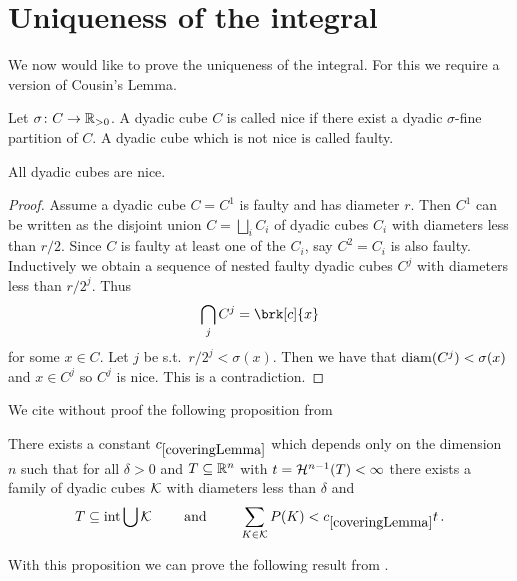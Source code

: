 \section*{Uniqueness of the integral}

We now would like to prove the uniqueness of the integral. For this we require a version of Cousin's Lemma.

\begin{definition}
Let $\sigma\colon C\to\mathbb{R}_{>0}$. A dyadic cube $C$ is called nice if there exist a dyadic $\sigma$-fine partition of $C$.
A dyadic cube which is not nice is called faulty.
\end{definition}

\begin{lemma}[Cousin]\label{le:Cousin}
All dyadic cubes are nice.
\end{lemma}
\begin{proof}
Assume a dyadic cube $C=C^1$ is faulty and has diameter $r$. Then $C^1$ can be written as the disjoint union $C=\bigsqcup_iC_i$ of dyadic cubes $C_i$ with diameters less than $r/2$. Since $C$ is faulty at least one of the $C_i$, say $C^2=C_i$ is also faulty. Inductively we obtain a sequence of nested faulty dyadic cubes $C^j$ with diameters less than $r/2^j$. Thus
\begin{align*}
	\bigcap_jC^j=\brk[c]{x}
\end{align*}
for some $x\in C$. Let $j$ be s.t.\ $r/2^j<\sigma(x)$. Then we have that $\operatorname{diam}(C^j)<\sigma(x)$ and $x\in C^j$ so $C^j$ is nice. This is a contradiction.
\end{proof}

We cite without proof the following proposition from \cite[Lemma 1.3.2]{Pfe2001}
\begin{proposition}\label{pr:coveringLemma}
There exists a constant $\useconstant{coveringLemma}$ which depends only on the dimension $n$ such that for all $\delta>0$ and $T\subseteq\mathbb{R}^n$ with $t=\mathcal{H}^{n-1}(T)<\infty$  there exists a family of dyadic cubes $\mathcal{K}$ with diameters less than $\delta$ and
\begin{align*}
	T\subseteq\interiour\bigcup\cK \qquad\text{ and }\qquad\sum_{K\in\cK}P(K)<\useconstant{coveringLemma} t\,.
\end{align*}
\end{proposition}

\noindent With this proposition we can prove the following result from \cite[Lemma 2.6.4]{Pfe2001}.

